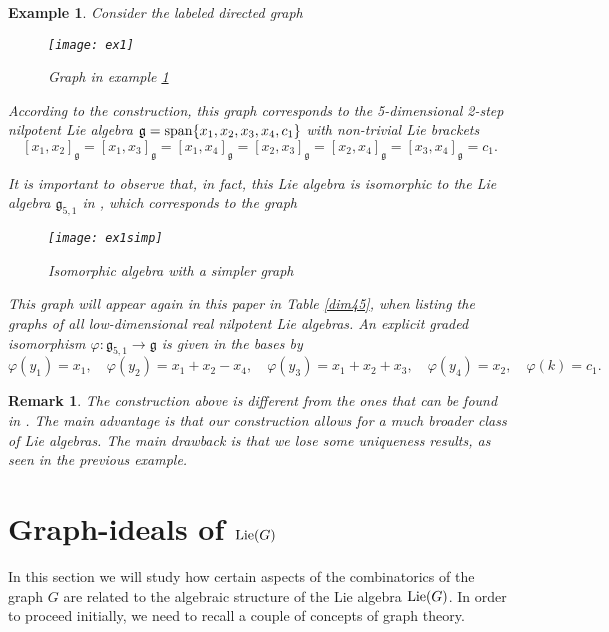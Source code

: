 \documentclass[12pt]{amsart}
\newtheorem{remark}[teo]{Remark}
\newtheorem{example}[teo]{Example}
\begin{document}
\begin{example}\label{ex:1} Consider the labeled directed graph

\begin{figure}[h]
\texttt{[image: ex1]}
\caption{Graph in example \ref{ex:1}}
\end{figure}

According to the construction, this graph corresponds to the 5-dimensional 2-step nilpotent Lie algebra ${\mathfrak{g}}={\rm span}\{x_1,x_2,x_3,x_4,c_1\}$ with non-trivial Lie brackets
\[
[x_1,x_2]_{\mathfrak{g}}=[x_1,x_3]_{\mathfrak{g}}=[x_1,x_4]_{\mathfrak{g}}=[x_2,x_3]_{\mathfrak{g}}=[x_2,x_4]_{\mathfrak{g}}=[x_3,x_4]_{\mathfrak{g}}=c_1.
\]

It is important to observe that, in fact, this Lie algebra is isomorphic to the Lie algebra ${\mathfrak{g}}_{5,1}$ in \cite{magnin}, which corresponds to the graph

\begin{figure}[h]
\texttt{[image: ex1simp]}
\caption{Isomorphic algebra with a simpler graph}
\end{figure}


This graph will appear again in this paper in Table \ref{dim45}, when listing the graphs of all low-dimensional real nilpotent Lie algebras. An explicit graded isomorphism $\varphi:{\mathfrak{g}}_{5,1}\to{\mathfrak{g}}$ is given in the bases by
\[
\varphi(y_1)=x_1,\quad\varphi(y_2)=x_1+x_2-x_4,\quad\varphi(y_3)=x_1+x_2+x_3,\quad\varphi(y_4)=x_2,\quad\varphi(k)=c_1.
\]
\end{example}

\begin{remark}
The construction above is different from the ones that can be found in \cite{mainkar1,ray}. The main advantage is that our construction allows for a much broader class of Lie algebras. The main drawback is that we lose some uniqueness results, as seen in the previous example.
\end{remark}

\section{Graph-ideals of ${\rm Lie}(G)$}\label{sec:ideal}

In this section we will study how certain aspects of the combinatorics of the graph $G$ are related to the algebraic structure of the Lie algebra ${\rm Lie}(G)$. In order to proceed initially, we need to recall a couple of concepts of graph theory.
\end{document}
